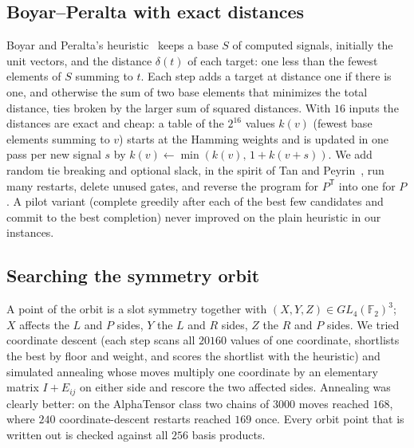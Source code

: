 \documentclass[11pt]{article}
\theoremstyle{remark}
\newcommand{\F}{\mathbb{F}}
\begin{document}
\subsection{Boyar--Peralta with exact distances}

Boyar and Peralta's heuristic~\cite{BP10,BMP13} keeps a base $S$ of
computed signals, initially the unit vectors, and the distance
$\delta(t)$ of each target: one less than the fewest elements of $S$
summing to $t$.  Each step adds a target at distance one if there is
one, and otherwise the sum of two base elements that minimizes the
total distance, ties broken by the larger sum of squared distances.
With $16$ inputs the distances are exact and cheap: a table of the
$2^{16}$ values $k(v)$ (fewest base elements summing to $v$) starts at
the Hamming weights and is updated in one pass per new signal $s$ by
$k(v)\leftarrow\min(k(v),\,1+k(v+s))$.  We add random tie breaking and
optional slack, in the spirit of Tan and Peyrin~\cite{TP20}, run many
restarts, delete unused gates, and reverse the program for $P^{\mathsf T}$
into one for $P$.  A pilot variant (complete greedily after each of the
best few candidates and commit to the best completion) never improved
on the plain heuristic in our instances.

\subsection{Searching the symmetry orbit}

A point of the orbit is a slot symmetry together with $(X,Y,Z)\in
GL_4(\F_2)^3$; $X$ affects the $L$ and $P$ sides, $Y$ the $L$ and $R$
sides, $Z$ the $R$ and $P$ sides.  We tried coordinate descent (each
step scans all $20160$ values of one coordinate, shortlists the best by
floor and weight, and scores the shortlist with the heuristic) and
simulated annealing whose moves multiply one coordinate by an
elementary matrix $I+E_{ij}$ on either side and rescore the two
affected sides.  Annealing was clearly better: on the AlphaTensor class
two chains of $3000$ moves reached $168$, where $240$ coordinate-descent
restarts reached $169$ once.  Every orbit point that is written out is
checked against all $256$ basis products.
\end{document}
